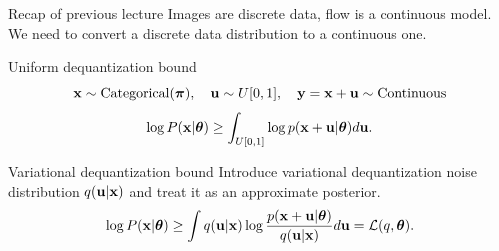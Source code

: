 
\usepackage{tikz}

\usetikzlibrary{arrows,shapes,positioning,shadows,trees}

\begin{frame}
\titlepage
\end{frame}
\begin{frame}{Recap of previous lecture}
Images are discrete data, flow is a continuous model.
We need to convert a discrete data distribution to a continuous one.

\begin{block}{Uniform dequantization bound}
	\vspace{-0.5cm}
	\[
	\mathbf{x} \sim \text{Categorical}(\boldsymbol{\pi}), \quad 
	\mathbf{u} \sim U[0, 1], \quad 
	\mathbf{y} = \mathbf{x} + \mathbf{u} \sim \text{Continuous} 
	\]
	\vspace{-0.4cm}
	\[
	\log P(\mathbf{x} | \boldsymbol{\theta}) \geq \int_{U[0, 1]} \log p(\mathbf{x} + \mathbf{u} | \boldsymbol{\theta}) d \mathbf{u}.
	\]
\end{block}
\vspace{-0.2cm}
\begin{block}{Variational dequantization bound}
	Introduce variational dequantization noise distribution $q(\mathbf{u} | \mathbf{x})$ and treat it as an approximate posterior. 
	\vspace{-0.2cm}
	\[
	\log P(\mathbf{x} | \boldsymbol{\theta}) \geq  \int q(\mathbf{u} | \mathbf{x}) \log \frac{p(\mathbf{x} + \mathbf{u} | \boldsymbol{\theta})}{q(\mathbf{u} | \mathbf{x})} d \mathbf{u} = \mathcal{L}(q, \boldsymbol{\theta}).
	\]
\end{block}
\end{frame}
